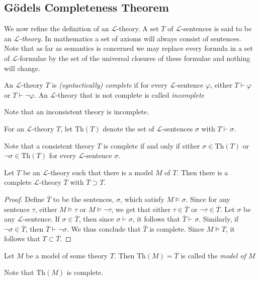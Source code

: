 \subsection{Gödels Completeness Theorem}
We now refine the definition of an $\mathcal{L}$-theory. A set $T$ of $\mathcal{L}$-sentences is said to be an \emph{$\mathcal{L}$-theory}. In mathematics a set of axioms will always consist of sentences. Note that as far as semantics is concerned we may replace every formula in a set of $\mathcal{L}$-formulae by the set of the universal closures of these formulae and nothing will change. 
\begin{definition}
    An $\mathcal{L}$-theory $T$ is \emph{(syntactically) complete} if for every $\mathcal{L}$-sentence $\varphi$, either $T \vdash \varphi$ or $T \vdash \neg\varphi$. An $\mathcal{L}$-theory that is not complete is called \emph{incomplete}
\end{definition}
\begin{remark}
    Note that an inconsistent theory is incomplete. 
\end{remark}
\begin{definition}
    For an $\mathcal{L}$-theory $T$, let $\mathrm{Th}(T)$ denote the set of $\mathcal{L}$-sentences $\sigma$ with $T\vdash \sigma$.
\end{definition}
\begin{remark}
    Note that a consistent theory $T$ is complete if and only if either $\sigma\in \mathrm{Th}(T)$ or $\neg \sigma \in\mathrm{Th}(T)$ for every $\mathcal{L}$-sentence $\sigma$.  
\end{remark}
\begin{theorem}
    Let $T$ be an $\mathcal{L}$-theory such that there is a model $M$ of $T$. Then there is a complete $\mathcal{L}$-theory $\overline{T}$ with $\overline{T}\supset T$. 
\end{theorem}
\begin{proof}
    Define $\overline{T}$ to be the sentences, $\sigma$, which satisfy $M\vDash \sigma$. Since for any sentence $\tau$, either $M\vDash \tau$ or $M\vDash \neg\tau$, we get that either $\tau\in \overline{T}$ or $\neg \tau\in \overline{T}$. Let $\sigma$ be any $\mathcal{L}$-sentence. If $\sigma\in \overline{T}$, then since $\sigma\vdash \sigma$, it follows that $\overline{T}\vdash \sigma$. Similarly, if $\neg\sigma\in \overline{T}$, then $\overline{T} \vdash \neg\sigma$. We thus conclude that $\overline{T}$ is complete. Since $M\vDash T$, it follows that $T\subset \overline{T}$.
\end{proof}
\begin{definition}
    Let $M$ be a model of some theory $T$. Then $\mathrm{Th}(M)=\overline{T}$ is called the \emph{model of $M$} 
\end{definition}
\begin{remark}
    Note that $\mathrm{Th}(M)$ is complete.
\end{remark}

